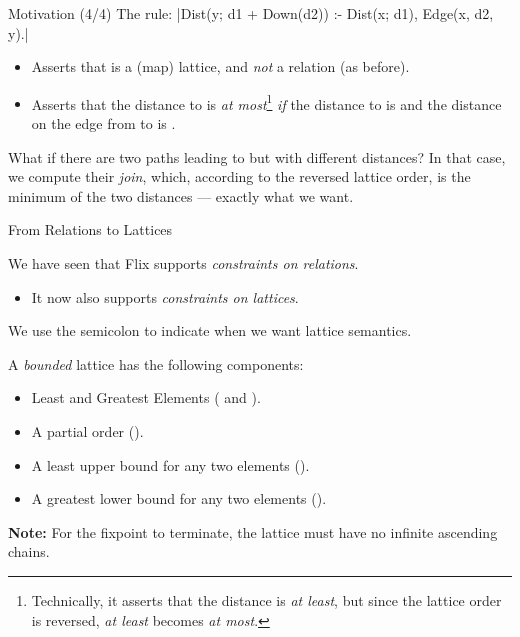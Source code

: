 \begin{frame}[fragile]{Motivation (4/4)}
The rule: \Code|Dist(y; d1 + Down(d2)) :- Dist(x; d1), Edge(x, d2, y).|
%
\begin{itemize}
    \pause \item Asserts that  is a (map) lattice, and \emph{not} a relation (as before).
    \pause \item Asserts that the distance to  is \emph{at
    most}\footnote{Technically, it asserts that the distance is \emph{at least},
    but since the lattice order is reversed, \emph{at least} becomes \emph{at
    most}.}  \emph{if} the distance to  is 
    and the distance on the edge from  to  is .
\end{itemize}

\pause 

What if there are two paths leading to  but with different distances?
In that case, we compute their \emph{join}, which, according to the reversed lattice
order, is the minimum of the two distances --- exactly what we want.
\end{frame}

\begin{frame}{From Relations to Lattices}

We have seen that Flix supports \emph{constraints on relations}. 

\begin{itemize}
    \item It now also supports \emph{constraints on lattices}.
\end{itemize}

We use the semicolon \Code{;} to indicate when we want lattice semantics.

\pause

A \emph{bounded} lattice has the following components:

\begin{itemize}
    \item Least and Greatest Elements ( and ).
    \item A partial order ().
    \item A least upper bound for any two elements ().
    \item A greatest lower bound for any two elements ().
\end{itemize}

\medskip

\small
\textbf{Note:} For the fixpoint to terminate, the lattice must have no infinite
ascending chains.

\end{frame}


